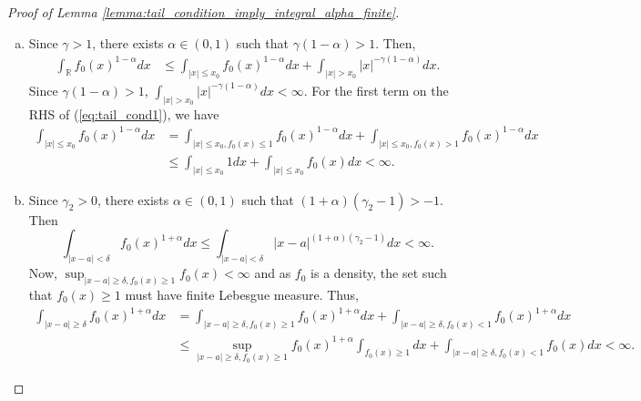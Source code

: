\documentclass[12pt,letterpaper, twoside, openany]{article}
\theoremstyle{plain}
\begin{document}
\begin{proof}[Proof of Lemma \ref{lemma:tail_condition_imply_integral_alpha_finite}]
\begin{enumerate}[(a)]
    \item Since $\gamma > 1$, there exists $\alpha \in (0, 1)$ such that $\gamma (1-\alpha) > 1$. Then,
\begin{align}\label{eq:tail_cond1}
    \int_{\mathbb{R}} f_0(x)^{1-\alpha} dx & \leq \int_{|x| \leq x_0} f_0(x)^{1-\alpha} dx + \int_{|x| > x_0} |x|^{-\gamma(1-\alpha)} dx.
\end{align}
Since $\gamma (1-\alpha) > 1$, $\int_{|x| > x_0} |x|^{-\gamma(1-\alpha)} dx < \infty$. For the first term on the RHS of (\ref{eq:tail_cond1}), we have
\begin{align*}
    \int_{|x| \leq x_0} f_0(x)^{1-\alpha} dx &= \int_{|x| \leq x_0, f_0(x) \leq 1} f_0(x)^{1-\alpha} dx +  \int_{|x| \leq x_0, f_0(x) > 1} f_0(x)^{1-\alpha}dx \\
    & \leq \int_{|x| \leq x_0} 1 dx + \int_{|x| \leq x_0} f_0(x) dx < \infty.
\end{align*}
\item Since $\gamma_2  > 0$, there exists $\alpha \in (0, 1)$ such that $(1+\alpha)(\gamma_2 - 1) > -1$.
Then
\begin{equation*}
    \int_{|x-a|< \delta} f_0(x)^{1+\alpha}dx \leq \int_{|x-a| < \delta} |x-a|^{(1+\alpha)(\gamma_2-1)} dx < \infty.
\end{equation*}
Now, $\sup_{|x-a| \geq \delta, f_0(x) \geq 1} f_0(x) < \infty$ and as $f_0$ is a density, the set such that $f_0(x) \geq 1$ must have finite Lebesgue measure. Thus,
\begin{align*}
    \int_{|x-a|\geq \delta} f_0(x)^{1+\alpha} dx &= 
    \int_{|x-a|\geq \delta, f_0(x) \geq 1} f_0(x)^{1+\alpha} dx + \int_{|x-a|\geq \delta, f_0(x) < 1} f_0(x)^{1+\alpha} dx \\
    &\leq \sup_{|x-a| \geq \delta, f_0(x) \geq 1} f_0(x)^{1+\alpha} \int_{f_0(x) \geq 1}dx  + \int_{|x-a| \geq \delta, f_0(x) < 1} f_0(x)dx  < \infty.
\end{align*}
\end{enumerate}

\end{proof}
\end{document}
